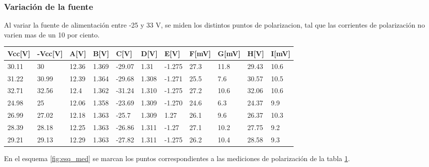 		\subsubsection{Variación de la fuente}
		Al variar la fuente de alimentación entre -25 y 33 V, se miden los distintos puntos de polarizacion, tal que las corrientes de polarización no varien mas de un 10 por ciento.
		\begin{table}[]
		\begin{tabular}{|l|l|l|l|l|l|l|l|l|l|l|}
		\hline
		Vcc{[}V{]} & -Vcc{[}V{]} & A{[}V{]} & B{[}V{]} & C{[}V{]} & D{[}V{]} & E{[}V{]} & F{[}mV{]} & G{[}mV{]} & H{[}V{]} & I{[}mV{]} \\ \hline
		30.11      & 30          & 12.36    & 1.369    & -29.07   & 1.31     & -1.275   & 27.3      & 11.8      & 29.43    & 10.6      \\ \hline
		31.22      & 30.99       & 12.39    & 1.364    & -29.68   & 1.308    & -1.271   & 25.5      & 7.6       & 30.57    & 10.5      \\ \hline
		32.71      & 32.56       & 12.4     & 1.362    & -31.24   & 1.310    & -1.275   & 27.2      & 10.6      & 32.06    & 10.6      \\ \hline
		24.98      & 25          & 12.06    & 1.358    & -23.69   & 1.309    & -1.270   & 24.6      & 6.3       & 24.37    & 9.9       \\ \hline
		26.99      & 27.02       & 12.18    & 1.363    & -25.7    & 1.309    & 1.27     & 26.1      & 9.6       & 26.37    & 10.3      \\ \hline
		28.39      & 28.18       & 12.25    & 1.363    & -26.86   & 1.311    & -1.27    & 27.1      & 10.2      & 27.75    & 9.2       \\ \hline
		29.21      & 29.13       & 12.29    & 1.363    & -27.82   & 1.311    & -1.275   & 26.2      & 10.4      & 28.58    & 9.3       \\ \hline
		\end{tabular}
		\label{tab.valores}
		\end{table}



		En el esquema \ref{fig:esq_med} se marcan los puntos correspondientes a las mediciones de polarización de la tabla \ref{tab.valores}.

